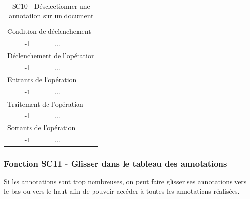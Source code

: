 \documentclass[a4paper]{article}
\begin{document}
\begin{table}[H]
  \centering
   \small
	\begin{tabular}{|c|p{12cm}|}
   		\hline
   			\rowcolor{lightgray}\multicolumn{2}{|c|}{\textbf{SC10 - Désélectionner une annotation sur un document}} \\
   		\hline
   			\multicolumn{2}{|l|}{Condition de d\'eclenchement} \\
   		\hline
   			-1 & ...\\
   		\hline
   			\multicolumn{2}{|l|}{D\'eclenchement de l'op\'eration} \\
   		\hline
   			-1 & ...\\
   		\hline
   			\multicolumn{2}{|l|}{Entrants de l'op\'eration} \\
   		\hline
   			-1 & ...\\
   		\hline
   			\multicolumn{2}{|l|}{Traitement de l'op\'eration} \\
  		\hline
   			-1 & ...\\
   		\hline
   			\multicolumn{2}{|l|}{Sortants de l'op\'eration} \\
   		\hline
   			-1 & ...\\
   		\hline
	\end{tabular}
  \caption{SC10 - Désélectionner une annotation sur un document}
  \normalsize
  \label{tab:deselectionner_annotation}
\end{table}


\subsubsection{Fonction SC11 - Glisser dans le tableau des annotations}
Si les annotations sont trop nombreuses, on peut faire glisser ses annotations vers le bas ou vers le haut afin de pouvoir accéder à toutes les annotations réalisées.\\
\end{document}

